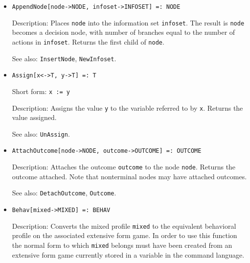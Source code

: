 \begin{itemize}
\item
\protect \large \begin{verbatim} 
AppendNode[node->NODE, infoset->INFOSET] =: NODE
\end{verbatim}\normalsize

\bd
\item
[Description:] Places \verb+node+ into the information set
\verb+infoset+.  The result is \verb+node+ becomes a decision node,
with number of branches equal to the number of actions in \verb+infoset+.
Returns the first child of \verb+node+.
\item
[See also:] {\tt InsertNode}, {\tt NewInfoset}.
\ed

\item 
\protect \large \begin{verbatim}
Assign[x<->T, y->T] =: T
\end{verbatim} \normalsize

\bd
\item
[Short form:] \verb+x := y+
\item
[Description:] Assigns the value \verb+y+ to the variable referred to by
\verb+x+.  Returns the value assigned.
\item
[See also:] {\tt UnAssign}.
\ed

\item
\protect \large \begin{verbatim} 
AttachOutcome[node->NODE, outcome->OUTCOME] =: OUTCOME
\end{verbatim}\normalsize

\bd
\item
[Description:] Attaches the outcome \verb+outcome+ to the node \verb+node+.
Returns the outcome attached.  Note that nonterminal nodes may have
attached outcomes.
\item
[See also:] {\tt DetachOutcome}, {\tt Outcome}.
\ed


\item
\protect \large \begin{verbatim}
Behav[mixed->MIXED] =: BEHAV
\end{verbatim}\normalsize

\bd
\item
[Description:] Converts the mixed profile \verb+mixed+ to the equivalent
behavioral profile on the associated extensive form game.  In order to use
this function the normal form to which \verb+mixed+ belongs must have
been created from an extensive form game currently stored in a variable
in the command language.
\ed


\end{itemize}
